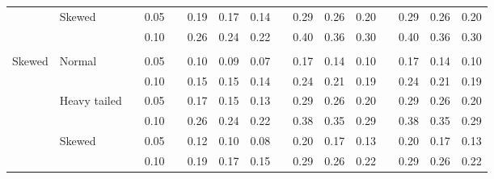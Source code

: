 \documentclass[12pt]{article} %
\begin{document}
\begin{table}[ht]
\begin{scriptsize}
\begin{center}
\begin{tabular}{ll p{.1cm} c p{.1cm} rrr p{.1cm} rrr p{.1cm} rrr}
             & Skewed       && 0.05 &&   0.19 & 0.17 & 0.14 && 0.29 & 0.26 & 0.20 && 0.29 & 0.26 & 0.20 \\ 
             &              && 0.10 &&   0.26 & 0.24 & 0.22 && 0.40 & 0.36 & 0.30 && 0.40 & 0.36 & 0.30 \\ 
             &&&&&&&&&&&&&&&\\
Skewed       & Normal       && 0.05 &&   0.10 & 0.09 & 0.07 && 0.17 & 0.14 & 0.10 && 0.17 & 0.14 & 0.10 \\ 
             &              && 0.10 &&   0.15 & 0.15 & 0.14 && 0.24 & 0.21 & 0.19 && 0.24 & 0.21 & 0.19 \\ 
             & Heavy tailed && 0.05 &&   0.17 & 0.15 & 0.13 && 0.29 & 0.26 & 0.20 && 0.29 & 0.26 & 0.20 \\ 
             &              && 0.10 &&   0.26 & 0.24 & 0.22 && 0.38 & 0.35 & 0.29 && 0.38 & 0.35 & 0.29 \\ 
             & Skewed       && 0.05 &&   0.12 & 0.10 & 0.08 && 0.20 & 0.17 & 0.13 && 0.20 & 0.17 & 0.13 \\ 
             &              && 0.10 &&   0.19 & 0.17 & 0.15 && 0.29 & 0.26 & 0.22 && 0.29 & 0.26 & 0.22 \\ 



\end{tabular}
\end{center}
\end{scriptsize}
\end{table}
\end{document}
